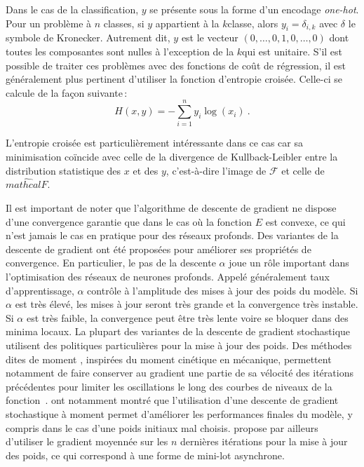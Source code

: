 Dans le cas de la classification, $y$ se présente sous la forme d'un encodage \emph{one-hot}. Pour un problème à $n$ classes, si $y$ appartient à la $k$\ieme classe, alors $y_i = \delta_{i,k}$ avec $\delta$ le symbole de Kronecker. Autrement dit, $y$ est le vecteur $(0, \dots, 0, 1, 0, \dots, 0)$ dont toutes les composantes sont nulles à l'exception de la $k$\ieme qui est unitaire. S'il est possible de traiter ces problèmes avec des fonctions de coût de régression, il est généralement plus pertinent d'utiliser la fonction d'entropie croisée. Celle-ci se calcule de la façon suivante\,:
$$H(x,y) = -\sum_{i=1}^n y_i \log(x_i)~.$$

L'entropie croisée est particulièrement intéressante dans ce cas car sa minimisation coïncide avec celle de la divergence de Kullback-Leibler entre la distribution statistique des $x$ et des $y$, c'est-à-dire l'image de $\mathcal{F}$ et celle de $\hat{mathcal{F}}$.

Il est important de noter que l'algorithme de descente de gradient ne dispose d'une convergence garantie que dans le cas où la fonction $E$ est convexe, ce qui n'est jamais le cas en pratique pour des réseaux profonds. Des variantes de la descente de gradient ont été proposées pour améliorer ses propriétés de convergence. En particulier, le pas de la descente $\alpha$ joue un rôle important dans l'optimisation des réseaux de neurones profonds. Appelé généralement taux d'apprentissage, $\alpha$ contrôle à l'amplitude des mises à jour des poids du modèle. Si $\alpha$ est très élevé, les mises à jour seront très grande et la convergence très instable. Si $\alpha$ est très faible, la convergence peut être très lente voire se bloquer dans des minima locaux. La plupart des variantes de la descente de gradient stochastique utilisent des politiques particulières pour la mise à jour des poids. Des méthodes dites de \og moment \fg, inspirées du moment cinétique en mécanique, permettent notamment de faire conserver au gradient une partie de sa vélocité des itérations précédentes pour limiter les oscillations le long des courbes de niveaux de la fonction~\cite{qian_momentum_1999,nesterov_method_1983}. \citet{sutskever_importance_2013-1} ont notamment montré que l'utilisation d'une descente de gradient stochastique à moment permet d'améliorer les performances finales du modèle, y compris dans le cas d'une poids initiaux mal choisis. \citet{polyak_acceleration_1992} propose par ailleurs d'utiliser le gradient moyennée sur les $n$ dernières itérations pour la mise à jour des poids, ce qui correspond à une forme de mini-lot asynchrone.

